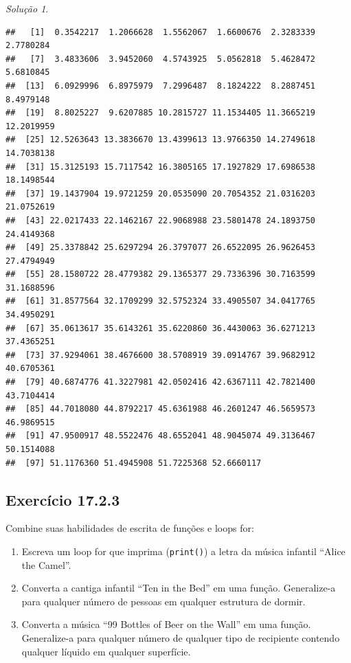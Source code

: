 \documentclass[
]{latex/krantz}
\providecommand{\tightlist}{%
  \setlength{\itemsep}{0pt}\setlength{\parskip}{0pt}}
\theoremstyle{definition}
\theoremstyle{definition}
\theoremstyle{definition}
\theoremstyle{definition}
\theoremstyle{remark}
\newtheorem*{solution}{Solução}
\begin{document}
\begin{solution}
\begin{verbatim}
##   [1]  0.3542217  1.2066628  1.5562067  1.6600676  2.3283339  2.7780284
##   [7]  3.4833606  3.9452060  4.5743925  5.0562818  5.4628472  5.6810845
##  [13]  6.0929996  6.8975979  7.2996487  8.1824222  8.2887451  8.4979148
##  [19]  8.8025227  9.6207885 10.2815727 11.1534405 11.3665219 12.2019959
##  [25] 12.5263643 13.3836670 13.4399613 13.9766350 14.2749618 14.7038138
##  [31] 15.3125193 15.7117542 16.3805165 17.1927829 17.6986538 18.1498544
##  [37] 19.1437904 19.9721259 20.0535090 20.7054352 21.0316203 21.0752619
##  [43] 22.0217433 22.1462167 22.9068988 23.5801478 24.1893750 24.4149368
##  [49] 25.3378842 25.6297294 26.3797077 26.6522095 26.9626453 27.4794949
##  [55] 28.1580722 28.4779382 29.1365377 29.7336396 30.7163599 31.1688596
##  [61] 31.8577564 32.1709299 32.5752324 33.4905507 34.0417765 34.4950291
##  [67] 35.0613617 35.6143261 35.6220860 36.4430063 36.6271213 37.4365251
##  [73] 37.9294061 38.4676600 38.5708919 39.0914767 39.9682912 40.6705361
##  [79] 40.6874776 41.3227981 42.0502416 42.6367111 42.7821400 43.7104414
##  [85] 44.7018080 44.8792217 45.6361988 46.2601247 46.5659573 46.9869515
##  [91] 47.9500917 48.5522476 48.6552041 48.9045074 49.3136467 50.1514088
##  [97] 51.1176360 51.4945908 51.7225368 52.6660117
\end{verbatim}

\end{solution}

\hypertarget{exr17-2-3}{%
\subsection*{Exercício 17.2.3}\label{exr17-2-3}}

Combine suas habilidades de escrita de funções e loops for:

\begin{enumerate}
\def\labelenumi{\alph{enumi}.}
\tightlist
\item
  Escreva um loop for que imprima (\texttt{print()}) a letra da música infantil ``Alice the Camel''.
\item
  Converta a cantiga infantil ``Ten in the Bed'' em uma função. Generalize-a para qualquer número de pessoas em qualquer estrutura de dormir.
\item
  Converta a música ``99 Bottles of Beer on the Wall'' em uma função. Generalize-a para qualquer número de qualquer tipo de recipiente contendo qualquer líquido em qualquer superfície.
\end{enumerate}
\end{document}
